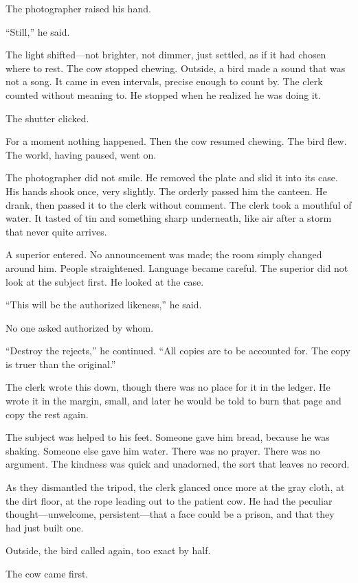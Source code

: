 The photographer raised his hand.

``Still,'' he said.

The light shifted---not brighter, not dimmer, just settled, as if it had chosen where to rest. The cow stopped chewing. Outside, a bird made a sound that was not a song. It came in even intervals, precise enough to count by. The clerk counted without meaning to. He stopped when he realized he was doing it.

The shutter clicked.

For a moment nothing happened. Then the cow resumed chewing. The bird flew. The world, having paused, went on.

The photographer did not smile. He removed the plate and slid it into its case. His hands shook once, very slightly. The orderly passed him the canteen. He drank, then passed it to the clerk without comment. The clerk took a mouthful of water. It tasted of tin and something sharp underneath, like air after a storm that never quite arrives.

A superior entered. No announcement was made; the room simply changed around him. People straightened. Language became careful. The superior did not look at the subject first. He looked at the case.

``This will be the authorized likeness,'' he said.

No one asked authorized by whom.

``Destroy the rejects,'' he continued. ``All copies are to be accounted for. The copy is truer than the original.''

The clerk wrote this down, though there was no place for it in the ledger. He wrote it in the margin, small, and later he would be told to burn that page and copy the rest again.

The subject was helped to his feet. Someone gave him bread, because he was shaking. Someone else gave him water. There was no prayer. There was no argument. The kindness was quick and unadorned, the sort that leaves no record.

As they dismantled the tripod, the clerk glanced once more at the gray cloth, at the dirt floor, at the rope leading out to the patient cow. He had the peculiar thought---unwelcome, persistent---that a face could be a prison, and that they had just built one.

Outside, the bird called again, too exact by half.

The cow came first.

\cleardoublepage
